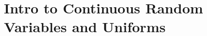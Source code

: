 \documentclass{article}
\begin{document}
 

\header







\section{Intro to Continuous Random Variables and Uniforms}
\end{document}
